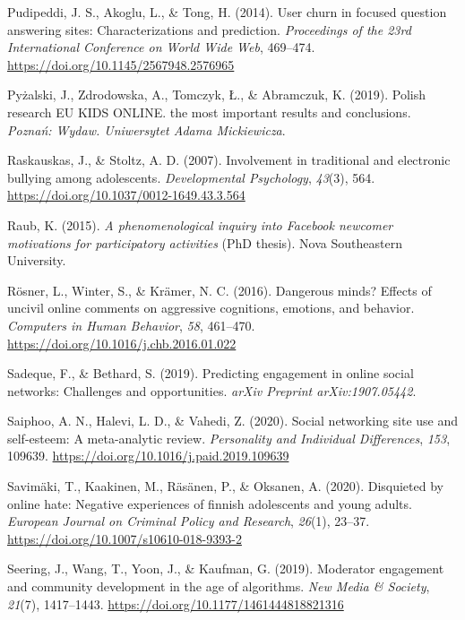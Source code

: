 \documentclass[10pt,dvipsnames]{scrartcl}
\begin{document}
\hypertarget{ref-pudipeddi2014user}{}
Pudipeddi, J. S., Akoglu, L., \& Tong, H. (2014). User churn in focused
question answering sites: Characterizations and prediction.
\emph{Proceedings of the 23rd International Conference on World Wide
Web}, 469--474. \url{https://doi.org/10.1145/2567948.2576965}

\hypertarget{ref-pyzalski2019polish}{}
Pyżalski, J., Zdrodowska, A., Tomczyk, Ł., \& Abramczuk, K. (2019).
Polish research EU KIDS ONLINE. the most important results and
conclusions. \emph{Poznań: Wydaw. Uniwersytet Adama Mickiewicza}.

\hypertarget{ref-raskauskas2007involvement}{}
Raskauskas, J., \& Stoltz, A. D. (2007). Involvement in traditional and
electronic bullying among adolescents. \emph{Developmental Psychology},
\emph{43}(3), 564. \url{https://doi.org/10.1037/0012-1649.43.3.564}

\hypertarget{ref-raub2015phenomenological}{}
Raub, K. (2015). \emph{A phenomenological inquiry into Facebook newcomer
motivations for participatory activities} (PhD thesis). Nova
Southeastern University.

\hypertarget{ref-rosner2016dangerous}{}
Rösner, L., Winter, S., \& Krämer, N. C. (2016). Dangerous minds?
Effects of uncivil online comments on aggressive cognitions, emotions,
and behavior. \emph{Computers in Human Behavior}, \emph{58}, 461--470.
\url{https://doi.org/10.1016/j.chb.2016.01.022}

\hypertarget{ref-sadeque2019predicting}{}
Sadeque, F., \& Bethard, S. (2019). Predicting engagement in online
social networks: Challenges and opportunities. \emph{arXiv Preprint
arXiv:1907.05442}.

\hypertarget{ref-saiphoo2020social}{}
Saiphoo, A. N., Halevi, L. D., \& Vahedi, Z. (2020). Social networking
site use and self-esteem: A meta-analytic review. \emph{Personality and
Individual Differences}, \emph{153}, 109639.
\url{https://doi.org/10.1016/j.paid.2019.109639}

\hypertarget{ref-savimaki2020disquieted}{}
Savimäki, T., Kaakinen, M., Räsänen, P., \& Oksanen, A. (2020).
Disquieted by online hate: Negative experiences of finnish adolescents
and young adults. \emph{European Journal on Criminal Policy and
Research}, \emph{26}(1), 23--37.
\url{https://doi.org/10.1007/s10610-018-9393-2}

\hypertarget{ref-seering2019moderator}{}
Seering, J., Wang, T., Yoon, J., \& Kaufman, G. (2019). Moderator
engagement and community development in the age of algorithms. \emph{New
Media \& Society}, \emph{21}(7), 1417--1443.
\url{https://doi.org/10.1177/1461444818821316}
\end{document}
